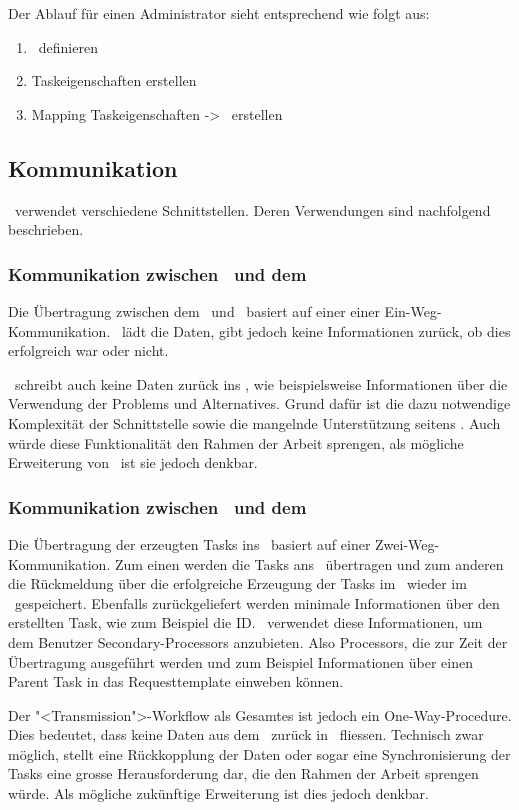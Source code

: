 		Der Ablauf für einen Administrator sieht entsprechend wie folgt aus:
		\begin{enumerate}
			\item \ppt\ definieren
			\item Taskeigenschaften erstellen
			\item Mapping Taskeigenschaften -> \ppt\ erstellen
		\end{enumerate}					
				
		
		\subsection{Kommunikation}
		\eeppi\ verwendet verschiedene Schnittstellen. Deren Verwendungen sind nachfolgend beschrieben.
			\subsubsection{Kommunikation zwischen \eeppi\ und dem \dks}
				Die Übertragung zwischen dem \dks\ und \eeppi\ basiert auf einer einer Ein-Weg-Kommunikation.
				\eeppi\ lädt die Daten, gibt jedoch keine Informationen zurück, ob dies erfolgreich war oder nicht.
				
				\eeppi\ schreibt auch keine Daten zurück ins \dks, wie beispielsweise Informationen über die Verwendung der Problems und Alternatives.
				Grund dafür ist die dazu notwendige Komplexität der Schnittstelle sowie die mangelnde Unterstützung seitens \dks.
				Auch würde diese Funktionalität den Rahmen der Arbeit sprengen, als mögliche Erweiterung von \eeppi\ ist sie jedoch denkbar.
				
			
			\subsubsection{Kommunikation zwischen \eeppi\ und dem \ppt}
				Die Übertragung der erzeugten Tasks ins \ppt\ basiert auf einer Zwei-Weg-Kommunikation.
				Zum einen werden die Tasks ans \ppt\ übertragen
				und zum anderen die Rückmeldung über die erfolgreiche Erzeugung der Tasks im \ppt\ wieder im \eeppi\ gespeichert.
				Ebenfalls zurückgeliefert werden minimale Informationen über den erstellten Task, 
				wie zum Beispiel die ID. 
				\eeppi\ verwendet diese Informationen, um dem Benutzer Secondary-Processors anzubieten.
				Also Processors, die zur Zeit der Übertragung ausgeführt werden und zum Beispiel Informationen über einen Parent Task in das Requesttemplate einweben können.
				
				Der "<Transmission">-Workflow als Gesamtes ist jedoch ein One-Way-Procedure.
				Dies bedeutet, dass keine Daten aus dem \ppt\ zurück in \eeppi\ fliessen.
				Technisch zwar möglich, stellt eine Rückkopplung der Daten oder sogar eine Synchronisierung der Tasks eine grosse Herausforderung dar, 
				die den Rahmen der Arbeit sprengen würde.
				Als mögliche zukünftige Erweiterung ist dies jedoch denkbar.